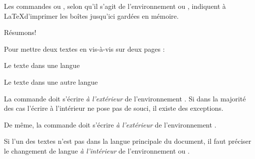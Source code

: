 Les commandes  ou , selon qu'il s'agit de l'environnement  ou , indiquent à \LaTeX  d'imprimer les boîtes jusqu'ici gardées en mémoire. 



Résumons!

Pour mettre deux textes en vis-à-vis sur deux pages :

\begin{latexcode}

\begin{pages}  %
\begin{Leftside} %
\beginnumbering %
\pstart %
 
Le texte dans une langue 
 
\pend
\endnumbering  %
\end{Leftside} %
 
\begin{Rightside}  %
\beginnumbering
\pstart
 
Le texte dans une autre langue
 
\pend
\endnumbering
\end{Rightside} 


\end{pages} %
\Pages %
\end{latexcode}

\begin{attention}
La commande  doit s'écrire \emph{à l'extérieur} de l'environnement . Si dans la majorité des cas l'écrire à l'intérieur ne pose pas de souci,  il existe des exceptions.

De même, la commande  doit s'écrire \emph{à l'extérieur} de l'environnement .
\end{attention}

\begin{attention}
Si l'un des textes n'est pas dans la langue principale du document, il faut préciser le changement de langue \emph{à l'intérieur} de l'environnement  ou .

\begin{latexcode}
\begin{Leftside}
\begin{<langue>}
\end{<langue>}
\end{Leftside}
\end{latexcode}
\end{attention}

